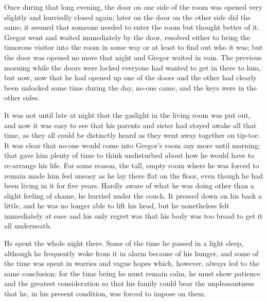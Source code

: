 Once during that long evening, the door on one side of the room was opened very slightly and hurriedly closed again; later on the door on the other side did the same; it seemed that someone needed to enter the room but thought better of it. Gregor went and waited immediately by the door, resolved either to bring the timorous visitor into the room in some way or at least to find out who it was; but the door was opened no more that night and Gregor waited in vain. The previous morning while the doors were locked everyone had wanted to get in there to him, but now, now that he had opened up one of the doors and the other had clearly been unlocked some time during the day, no-one came, and the keys were in the other sides.

It was not until late at night that the gaslight in the living room was put out, and now it was easy to see that his parents and sister had stayed awake all that time, as they all could be distinctly heard as they went away together on tip-toe. It was clear that no-one would come into Gregor's room any more until morning; that gave him plenty of time to think undisturbed about how he would have to re-arrange his life. For some reason, the tall, empty room where he was forced to remain made him feel uneasy as he lay there flat on the floor, even though he had been living in it for five years. Hardly aware of what he was doing other than a slight feeling of shame, he hurried under the couch. It pressed down on his back a little, and he was no longer able to lift his head, but he nonetheless felt immediately at ease and his only regret was that his body was too broad to get it all underneath.

He spent the whole night there. Some of the time he passed in a light sleep, although he frequently woke from it in alarm because of his hunger, and some of the time was spent in worries and vague hopes which, however, always led to the same conclusion: for the time being he must remain calm, he must show patience and the greatest consideration so that his family could bear the unpleasantness that he, in his present condition, was forced to impose on them.

